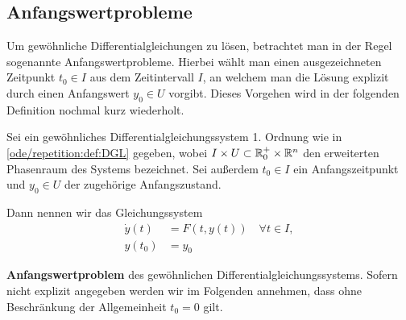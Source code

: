 \subsection{Anfangswertprobleme}
\label{\detokenize{ode/repetition:anfangswertprobleme}}
\par
Um gewöhnliche Differentialgleichungen zu lösen, betrachtet man in der Regel sogenannte Anfangswertprobleme.
Hierbei wählt man einen ausgezeichneten Zeitpunkt \(t_0\in I\) aus dem Zeitintervall \(I\), an welchem man die Lösung explizit durch einen Anfangswert \(y_0\in U\) vorgibt.
Dieses Vorgehen wird in der folgenden Definition nochmal kurz wiederholt.
\label{ode/repetition:def:anfangswertproblem}
\begin{definition}{}{}



\par
Sei ein gewöhnliches Differentialgleichungssystem 1. Ordnung wie in \cref{ode/repetition:def:DGL} gegeben, wobei \(I \times U \subset \mathbb{R}_0^+ \times \mathbb{R}^n\) den erweiterten Phasenraum des Systems bezeichnet.
Sei außerdem \(t_0 \in I\) ein Anfangszeitpunkt und \(y_0 \in U\) der zugehörige Anfangszustand.

\par
Dann nennen wir das Gleichungssystem
\begin{align}\label{equation:ode/repetition:eq:AWP}
\dot{y}(t) &= F(t, y(t))\quad\forall t\in I, \\
y(t_0) &= y_0
\end{align}
\par
\textbf{Anfangswertproblem} des gewöhnlichen Differentialgleichungssystems.
Sofern nicht explizit angegeben werden wir im Folgenden annehmen, dass ohne Beschränkung der Allgemeinheit \(t_0=0\) gilt.
\end{definition}

